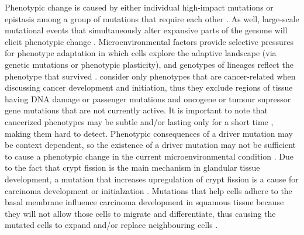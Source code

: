 \documentclass[\main/thesis.tex]{subfiles}
\begin{document}
Phenotypic change is caused by either individual high-impact mutations or 
epistasis among a group of mutations that require each other 
\parencite{Curtius}. As well, large-scale mutational events that simultaneously 
alter expansive parts of the genome will elicit phenotypic change 
\parencite{Li,Stachler}. Microenvironmental factors provide selective pressures 
for phenotype adaptation in which cells explore the adaptive landscape (via 
genetic mutations or phenotypic plasticity), and genotypes of lineages reflect 
the phenotype that survived \parencite{Curtius}. \textcite{Curtius} consider 
only phenotypes that are cancer-related when discussing cancer development and 
initiation, thus they exclude regions of tissue having DNA damage or passenger 
mutations and oncogene or tumour supressor gene mutations that are not currently 
active. It is important to note that cancerized phenotypes may be subtle and/or 
lasting only for a short time \parencite{Curtius}, making them hard to detect. 
Phenotypic consequences of a driver mutation may be context dependent, so the 
existence of a driver mutation may not be sufficient to cause a phenotypic 
change in the current microenvironmental condition \parencite{Curtius}. Due to 
the fact that crypt fission is the main mechanism in glandular tissue 
development, a mutation that increases upregulation of crypt fission is a cause 
for carcinoma development or initialzation \parencite{Curtius}. Mutations that 
help cells adhere to the basal membrane influence carcinoma development in 
squamous tissue because they will not allow those cells to migrate 
and differentiate, thus causing the mutated cells to expand and/or replace 
neighbouring cells \parencite{Curtius}.
\end{document}
